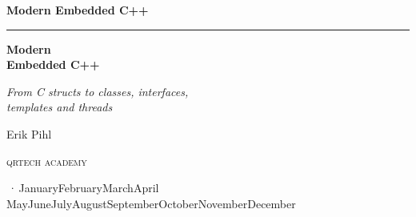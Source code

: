 %
\providecommand{\bookversion}{}
\newcommand{\bookdate}{\number\day\space\ifcase\month\or January\or February\or March\or April\or
  May\or June\or July\or August\or September\or October\or November\or December\fi\space
  \number\year}
\newcommand{\bookedition}{\ifx\bookversion\empty\else\bookversion\,·\,\fi\bookdate}

\thispagestyle{empty}
\vspace*{2.2in}
\begin{flushright}
  {\Large\bfseries Modern Embedded C++}
\end{flushright}
\cleardoublepage

\thispagestyle{empty}
\vspace*{1.1in}
\begin{flushleft}
  {\color{accent}\rule{0.9in}{2.5pt}}\par\vspace{1.4ex}
  {\fontsize{32}{38}\selectfont\bfseries Modern\\[0.15ex] Embedded C++\par}
  \vspace{2.2ex}
  {\Large\itshape From C structs to classes, interfaces,\\templates and threads\par}
  \vspace{1.2in}
  {\large Erik Pihl\par}
  \vfill
  {\small\scshape\lsstyle qrtech academy\par}
  \vspace{0.6ex}
  {\small\color{muted} \bookedition\par}
\end{flushleft}
\newpage


